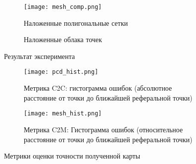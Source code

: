 \begin{figure}[hp!]
    \begin{center}
    \begin{subfigure}[t]{0.4\textwidth}
        \centering\texttt{[image: mesh\_comp.png]}
        \caption{Наложенные полигональные сетки}
    \end{subfigure}
    \begin{subfigure}[t]{0.59\textwidth}
            \centering
            \caption{Наложенные облака точек}
            \label{fig:sampled_pcd.png}
    \end{subfigure}
    \caption{Результат эксперимента}
    \label{fig:result_meshes_blah}
\end{center}
\end{figure}

\begin{figure}[ht]
    \begin{subfigure}[t]{0.49\textwidth}
        \centering\texttt{[image: pcd\_hist.png]}
        \caption{Метрика C2C: гистограмма ошибок (абсолютное расстояние от точки до ближайшей реферальной точки)}
        \label{fig:metric_c2c}
    \end{subfigure}
    \begin{subfigure}[t]{0.49\textwidth}
        \centering\texttt{[image: mesh\_hist.png]}
        \caption{Метрика C2M: Гистограмма ошибок (относительное расстояние от точки до ближайшей реферальной точки)}
        \label{fig:metric_c2m}
    \end{subfigure}
    \caption{Метрики оценки точности полученной карты}
    \label{fig:metrics}
\end{figure}


